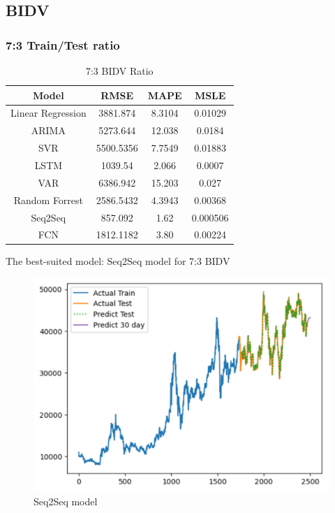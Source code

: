 \documentclass{ieeeojies}
\begin{document}
\subsection{BIDV}
\subsubsection{7:3 Train/Test ratio}

\begin{table}[H]
    \centering
    \begin{tabular}{|c|c|c|c|}
    \hline
    Model & \textbf{RMSE} & \textbf{MAPE} & \textbf{MSLE} \\
    \hline
    Linear Regression & 3881.874 & 8.3104 & 0.01029 \\
    \hline
    ARIMA & 5273.644 & 12.038 & 0.0184 \\
    \hline
    SVR & 5500.5356 & 7.7549 & 0.01883 \\
    \hline
    LSTM & 1039.54 & 2.066 & 0.0007 \\
    \hline
    VAR & 6386.942 & 15.203 & 0.027 \\
    \hline
    Random Forrest & 2586.5432 & 4.3943 & 0.00368 \\
    \hline
    \rowcolor{red!10}
    Seq2Seq & 857.092 & 1.62 & 0.000506 \\
    \hline
    FCN & 1812.1182 & 3.80 & 0.00224 \\
    \hline
    \end{tabular}
    \caption{7:3 BIDV Ratio}
    \label{tab:my_label}
\end{table}
The best-suited model: Seq2Seq model for 7:3 BIDV
\begin{figure}[H]
    \centering
    \includegraphics[width=1\linewidth]{bidv_s2s_73.png}
    \caption{Seq2Seq model}
    \label{fig:enter-label}
\end{figure}
\end{document}
